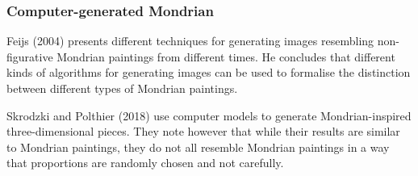 
\subsubsection{Computer-generated Mondrian}



Feijs (2004)\cite{Feijs2004} presents different techniques for generating images
resembling non-figurative Mondrian paintings from different times. He  concludes
that different kinds of algorithms for generating images can be used to
formalise the distinction between different types of Mondrian paintings.


Skrodzki and Polthier (2018) \cite{Skrodzki2018} use computer models to generate
Mondrian-inspired three-dimensional pieces. They note however that while their
results are similar to Mondrian paintings, they do not all resemble Mondrian
paintings in a way that proportions are randomly chosen and not carefully.
